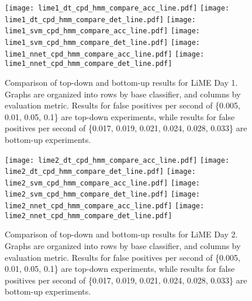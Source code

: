 \begin{figure}[h]
 \centering
 \texttt{[image: lime1\_dt\_cpd\_hmm\_compare\_acc\_line.pdf]} \hspace{1em}\vspace{1em}
 \texttt{[image: lime1\_dt\_cpd\_hmm\_compare\_det\_line.pdf]} 
 \texttt{[image: lime1\_svm\_cpd\_hmm\_compare\_acc\_line.pdf]} \hspace{1em}\vspace{1em}
 \texttt{[image: lime1\_svm\_cpd\_hmm\_compare\_det\_line.pdf]}
 \texttt{[image: lime1\_nnet\_cpd\_hmm\_compare\_acc\_line.pdf]} \hspace{1em}
 \texttt{[image: lime1\_nnet\_cpd\_hmm\_compare\_det\_line.pdf]}
 \caption{Comparison of top-down and bottom-up results for LiME Day 1.
  Graphs are organized into rows by base classifier, and columns by evaluation
  metric. Results for false positives per second of \{0.005, 0.01, 0.05, 0.1\} are
  top-down experiments, while results for false positives per second of
  \{0.017, 0.019, 0.021, 0.024, 0.028, 0.033\} are bottom-up experiments.}
 \label{fig:lime1_compare_cpd_hmm}
\end{figure}

\begin{figure}[h]
 \centering
 \texttt{[image: lime2\_dt\_cpd\_hmm\_compare\_acc\_line.pdf]} \hspace{1em}\vspace{1em}
 \texttt{[image: lime2\_dt\_cpd\_hmm\_compare\_det\_line.pdf]} 
 \texttt{[image: lime2\_svm\_cpd\_hmm\_compare\_acc\_line.pdf]} \hspace{1em}\vspace{1em}
 \texttt{[image: lime2\_svm\_cpd\_hmm\_compare\_det\_line.pdf]}
 \texttt{[image: lime2\_nnet\_cpd\_hmm\_compare\_acc\_line.pdf]} \hspace{1em}
 \texttt{[image: lime2\_nnet\_cpd\_hmm\_compare\_det\_line.pdf]}
 \caption{Comparison of top-down and bottom-up results for LiME Day 2.
  Graphs are organized into rows by base classifier, and columns by evaluation
  metric. Results for false positives per second of \{0.005, 0.01, 0.05, 0.1\} are
  top-down experiments, while results for false positives per second of
  \{0.017, 0.019, 0.021, 0.024, 0.028, 0.033\} are bottom-up experiments.}
 \label{fig:lime2_compare_cpd_hmm}
\end{figure}

